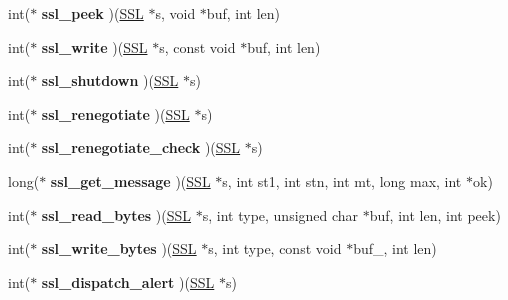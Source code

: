 \begin{DoxyCompactItemize}
int($\ast$ {\bfseries ssl\+\_\+peek} )(\hyperlink{structssl__st}{S\+SL} $\ast$s, void $\ast$buf, int len)
\item 
\mbox{\label{structssl__method__st_aeaa1745bfd8cea08b5d943fa49c1804a}} 
int($\ast$ {\bfseries ssl\+\_\+write} )(\hyperlink{structssl__st}{S\+SL} $\ast$s, const void $\ast$buf, int len)
\item 
\mbox{\label{structssl__method__st_a7dc97d1a59c10baa705a23e5aa4f7546}} 
int($\ast$ {\bfseries ssl\+\_\+shutdown} )(\hyperlink{structssl__st}{S\+SL} $\ast$s)
\item 
\mbox{\label{structssl__method__st_a68ba7cb568d9c9c3e2bd15020a30beb0}} 
int($\ast$ {\bfseries ssl\+\_\+renegotiate} )(\hyperlink{structssl__st}{S\+SL} $\ast$s)
\item 
\mbox{\label{structssl__method__st_a07e92db03c1a7907ed8346916c038215}} 
int($\ast$ {\bfseries ssl\+\_\+renegotiate\+\_\+check} )(\hyperlink{structssl__st}{S\+SL} $\ast$s)
\item 
\mbox{\label{structssl__method__st_a128347c6e6007078bc17af9c64b566f3}} 
long($\ast$ {\bfseries ssl\+\_\+get\+\_\+message} )(\hyperlink{structssl__st}{S\+SL} $\ast$s, int st1, int stn, int mt, long max, int $\ast$ok)
\item 
\mbox{\label{structssl__method__st_a9f992bd27f8e79cf166c9783bdc29932}} 
int($\ast$ {\bfseries ssl\+\_\+read\+\_\+bytes} )(\hyperlink{structssl__st}{S\+SL} $\ast$s, int type, unsigned char $\ast$buf, int len, int peek)
\item 
\mbox{\label{structssl__method__st_a20933c416539a546d3749a725e0602e7}} 
int($\ast$ {\bfseries ssl\+\_\+write\+\_\+bytes} )(\hyperlink{structssl__st}{S\+SL} $\ast$s, int type, const void $\ast$buf\+\_\+, int len)
\item 
\mbox{\label{structssl__method__st_a1164901a31bb98ce046b971a09b29321}} 
int($\ast$ {\bfseries ssl\+\_\+dispatch\+\_\+alert} )(\hyperlink{structssl__st}{S\+SL} $\ast$s)
\item 
\mbox{\label{structssl__method__st_a00f03ff5d9c47885e4cf9340ccb91dd8}} 

\end{DoxyCompactItemize}
